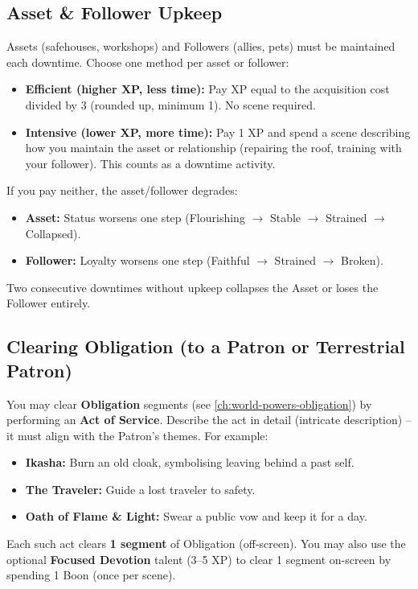 \subsection{Asset \& Follower Upkeep}
Assets (safehouses, workshops) and Followers (allies, pets) must be maintained each downtime. Choose one method per asset or follower:

\begin{itemize}
  \item \textbf{Efficient (higher XP, less time):} Pay XP equal to the acquisition cost divided by 3 (rounded up, minimum 1). No scene required.
  \item \textbf{Intensive (lower XP, more time):} Pay 1 XP and spend a scene describing how you maintain the asset or relationship (repairing the roof, training with your follower). This counts as a downtime activity.
\end{itemize}
If you pay neither, the asset/follower degrades:
\begin{itemize}
  \item \textbf{Asset:} Status worsens one step (Flourishing $\rightarrow$ Stable $\rightarrow$ Strained $\rightarrow$ Collapsed).
  \item \textbf{Follower:} Loyalty worsens one step (Faithful $\rightarrow$ Strained $\rightarrow$ Broken).
\end{itemize}
Two consecutive downtimes without upkeep collapses the Asset or loses the Follower entirely.

\subsection{Clearing Obligation (to a Patron or Terrestrial Patron)}
You may clear \textbf{Obligation} segments (see \ref{ch:world-powers-obligation}) by performing an \textbf{Act of Service}. Describe the act in detail (intricate description) -- it must align with the Patron's themes. For example:
\begin{itemize}
  \item \textbf{Ikasha:} Burn an old cloak, symbolising leaving behind a past self.
  \item \textbf{The Traveler:} Guide a lost traveler to safety.
  \item \textbf{Oath of Flame \& Light:} Swear a public vow and keep it for a day.
\end{itemize}
Each such act clears \textbf{1 segment} of Obligation (off-screen). You may also use the optional \textbf{Focused Devotion} talent (3--5 XP) to clear 1 segment on-screen by spending 1 Boon (once per scene).

